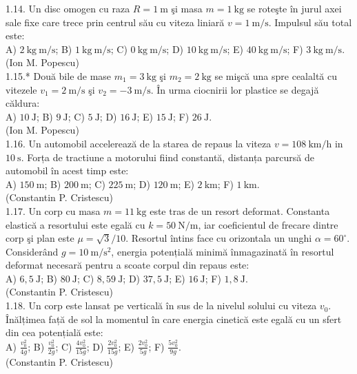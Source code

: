 1.14. Un disc omogen cu raza $R=1 \mathrm{~m}$ şi masa $m=1 \mathrm{~kg}$ se roteşte în jurul axei sale fixe care trece prin centrul său cu viteza liniară $v=1 \mathrm{~m} / \mathrm{s}$. Impulsul său total este:\\ A) $2 \mathrm{~kg} \mathrm{~m} / \mathrm{s}$; B) $1 \mathrm{~kg} \mathrm{~m} / \mathrm{s}$; C) $0 \mathrm{~kg} \mathrm{~m} / \mathrm{s}$; D) $10 \mathrm{~kg} \mathrm{~m} / \mathrm{s}$; E) $40 \mathrm{~kg} \mathrm{~m} / \mathrm{s}$; F) $3 \mathrm{~kg} \mathrm{~m} / \mathrm{s}$.\\ (Ion M. Popescu)\\

1.15.* Două bile de mase $m_{1}=3 \mathrm{~kg}$ şi $m_{2}=2 \mathrm{~kg}$ se mişcă una spre cealaltă cu vitezele $v_{1}=2 \mathrm{~m} / \mathrm{s}$ şi $v_{2}=-3 \mathrm{~m} / \mathrm{s}$. În urma ciocnirii lor plastice se degajă căldura:\\ A) $10 \mathrm{~J}$; B) $9 \mathrm{~J}$; C) $5 \mathrm{~J}$; D) $16 \mathrm{~J}$; E) $15 \mathrm{~J}$; F) $26 \mathrm{~J}$.\\ (Ion M. Popescu)\\

1.16. Un automobil accelerează de la starea de repaus la viteza $v=108 \mathrm{~km} / \mathrm{h}$ in $10 \mathrm{~s}$. Forța de tractiune a motorului fiind constantă, distanța parcursă de automobil în acest timp este:\\ A) $150 \mathrm{~m}$; B) $200 \mathrm{~m}$; C) $225 \mathrm{~m}$; D) $120 \mathrm{~m}$; E) $2 \mathrm{~km}$; F) $1 \mathrm{~km}$.\\ (Constantin P. Cristescu)\\

1.17. Un corp cu masa $m=11 \mathrm{~kg}$ este tras de un resort deformat. Constanta elastică a resortului este egală cu $k=50 \mathrm{~N} / \mathrm{m}$, iar coeficientul de frecare dintre corp şi plan este $\mu=\sqrt{3} / 10$. Resortul întins face cu orizontala un unghi $\alpha=60^{\circ}$. Considerând $g=10 \mathrm{~m} / \mathrm{s}^{2}$, energia potențială minimă înmagazinată în resortul deformat necesară pentru a scoate corpul din repaus este:\\ A) $6,5 \mathrm{~J}$; B) $80 \mathrm{~J}$; C) $8,59 \mathrm{~J}$; D) $37,5 \mathrm{~J}$; E) $16 \mathrm{~J}$; F) $1,8 \mathrm{~J}$.\\ (Constantin P. Cristescu)\\

1.18. Un corp este lansat pe verticală în sus de la nivelul solului cu viteza $v_{0}$. Înălțimea față de sol la momentul în care energia cinetică este egală cu un sfert din cea potențială este:\\ A) $\frac{v_{0}^{2}}{4 g}$; B) $\frac{v_{0}^{2}}{2 g}$; C) $\frac{4 v_{0}^{2}}{15 g}$; D) $\frac{2 v_{0}^{2}}{15 g}$; E) $\frac{2 v_{0}^{2}}{5 g}$; F) $\frac{5 v_{0}^{2}}{9 g}$.\\ (Constantin P. Cristescu)\\

